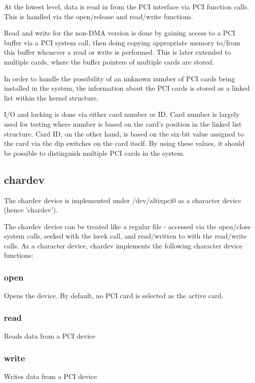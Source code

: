 \documentclass[12pt]{article}
\begin{document}
At the lowest level, data is read in from the PCI interface via PCI function calls.  This is handled via the open/release and read/write functions. 

Read and write for the non-DMA version is done by gaining access to a PCI buffer via a PCI system call, then doing copying appropriate memory to/from this buffer whenever a read or write is performed.  This is later extended to multiple cards, where the buffer pointers of multiple cards are stored.

In order to handle the possibility of an unknown number of PCI cards being installed in the system, the information about the PCI cards is stored as a linked list within the kernel structure.  

I/O and locking is done via either card number or ID.  Card number is largely used for testing where number is based on the card's position in the linked list structure.  Card ID, on the other hand, is based on the six-bit value assigned to the card via the dip switches on the card itself.  By using these values, it should be possible to distinguish multiple PCI cards in the system.

\subsection{chardev}

The chardev device is implemented under /dev/altixpci0 as a character device (hence 'chardev').  

The chardev device can be treated like a regular file - accessed via the open/close system calls, seeked with the lseek call, and read/written to with the read/write calls.  As a character device, chardev implements the following character device functions:

\subsubsection{open}
Opens the device.  By default, no PCI card is selected as the active card.

\subsubsection{read}
Reads data from a PCI device

\subsubsection{write}
Writes data from a PCI device
\end{document}
